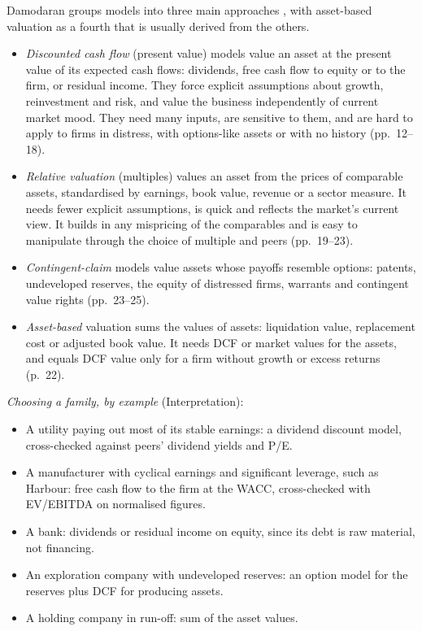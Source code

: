 \begin{qfdefinition}\label{def:valuation-model-families}
 Damodaran groups models into three main approaches \citep[pp.~11--25]{investment-valuation-2012}, with asset-based valuation as a fourth that is usually derived from the others.
\begin{itemize}
\item \emph{Discounted cash flow} (present value) models value an asset at the present value of its expected cash flows: dividends, free cash flow to equity or to the firm, or residual income. They force explicit assumptions about growth, reinvestment and risk, and value the business independently of current market mood. They need many inputs, are sensitive to them, and are hard to apply to firms in distress, with options-like assets or with no history (pp.~12--18).
\item \emph{Relative valuation} (multiples) values an asset from the prices of comparable assets, standardised by earnings, book value, revenue or a sector measure. It needs fewer explicit assumptions, is quick and reflects the market's current view. It builds in any mispricing of the comparables and is easy to manipulate through the choice of multiple and peers (pp.~19--23).
\item \emph{Contingent-claim} models value assets whose payoffs resemble options: patents, undeveloped reserves, the equity of distressed firms, warrants and contingent value rights (pp.~23--25).
\item \emph{Asset-based} valuation sums the values of assets: liquidation value, replacement cost or adjusted book value. It needs DCF or market values for the assets, and equals DCF value only for a firm without growth or excess returns (p.~22).
\end{itemize}

 \emph{Choosing a family, by example} (Interpretation):
\begin{itemize}
\item A utility paying out most of its stable earnings: a dividend discount model, cross-checked against peers' dividend yields and P/E.
\item A manufacturer with cyclical earnings and significant leverage, such as Harbour: free cash flow to the firm at the WACC, cross-checked with EV/EBITDA on normalised figures.
\item A bank: dividends or residual income on equity, since its debt is raw material, not financing.
\item An exploration company with undeveloped reserves: an option model for the reserves plus DCF for producing assets.
\item A holding company in run-off: sum of the asset values.
\end{itemize}


\end{qfdefinition}
